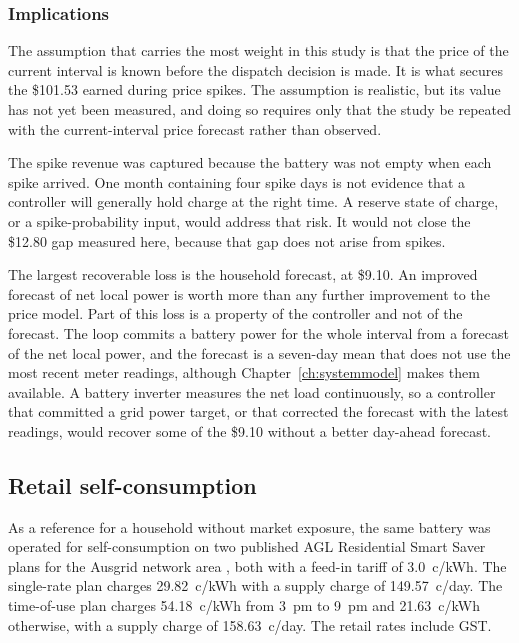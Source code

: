 \subsubsection{Implications}
\label{sec:results:mpc:implications}

The assumption that carries the most weight in this study is that the price of the
current interval is known before the dispatch decision is made. It is what secures the
\$101.53 earned during price spikes. The assumption is realistic, but its value has not
yet been measured, and doing so requires only that the study be repeated with the
current-interval price forecast rather than observed.

The spike revenue was captured because the battery was not empty when each spike
arrived. One month containing four spike days is not evidence that a controller will
generally hold charge at the right time. A reserve state of charge, or a
spike-probability input, would address that risk. It would not close the \$12.80 gap
measured here, because that gap does not arise from spikes.

The largest recoverable loss is the household forecast, at \$9.10. An improved forecast
of net local power is worth more than any further improvement to the price model. Part
of this loss is a property of the controller and not of the forecast. The loop commits a
battery power for the whole interval from a forecast of the net local power, and the
forecast is a seven-day mean that does not use the most recent meter readings, although
Chapter~\ref{ch:systemmodel} makes them available. A battery inverter measures the net
load continuously, so a controller that committed a grid power target, or that
corrected the forecast with the latest readings, would recover some of the \$9.10
without a better day-ahead forecast.

\subsection{Retail self-consumption}
\label{sec:results:retail}

As a reference for a household without market exposure, the same battery was operated
for self-consumption on two published AGL Residential Smart Saver plans for the Ausgrid
network area \cite{AGLSmartSaver}, %
both with a feed-in tariff of 3.0~c/kWh. The single-rate plan charges 29.82~c/kWh with a
supply charge of 149.57~c/day. The time-of-use plan charges 54.18~c/kWh from 3~pm to
9~pm and 21.63~c/kWh otherwise, with a supply charge of 158.63~c/day. The retail rates
include GST.

